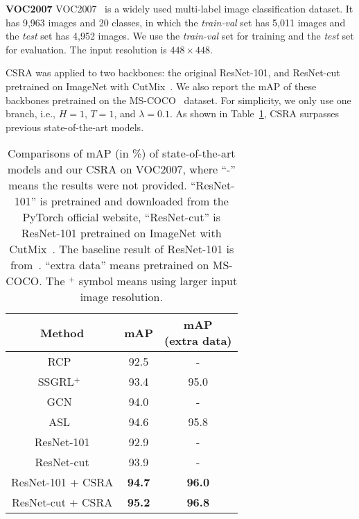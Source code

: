 \documentclass[10pt,twocolumn,letterpaper]{article}
\begin{document}
\noindent\textbf{VOC2007} VOC2007~\cite{VOC} is a widely used multi-label image classification dataset. It has 9,963 images and 20 classes, in which the \emph{train-val} set has 5,011 images and the \emph{test} set has 4,952 images. We use the \emph{train-val} set for training and the \emph{test} set for evaluation. The input resolution is $448 \times 448$.

CSRA was applied to two backbones: the original ResNet-101, and ResNet-cut pretrained on ImageNet with CutMix~\cite{cutmix}. We also report the mAP of these backbones pretrained on the MS-COCO~\cite{MSCOCO} dataset. For simplicity, we only use one branch, i.e., $H=1$, $T=1$, and $\lambda=0.1$. As shown in Table~\ref{tab:voc2007}, CSRA surpasses previous state-of-the-art models.

\begin{table}
	\caption{Comparisons of mAP (in \%) of state-of-the-art models and our CSRA on VOC2007, where ``-'' means the results were not provided. ``ResNet-101'' is pretrained and downloaded from the PyTorch official website, ``ResNet-cut'' is ResNet-101 pretrained on ImageNet with CutMix~\cite{cutmix}. The baseline result of ResNet-101 is from~\cite{2020_arxiv_Gaobb}. ``extra data'' means pretrained on MS-COCO. The $^+$ symbol means using larger input image resolution.}
	\label{tab:voc2007}
	\centering
	\small
	\begin{tabular}{c|cc}
		\hline
		Method                       & mAP           & \thead{mAP\\(extra data)} \\
		\hline\hline
		RCP~\cite{2016_ICIP_RCP}     & 92.5          & -                              \\
		SSGRL$^+$~\cite{2019_ICCV_GCNre} & 93.4          & 95.0                           \\
		GCN~\cite{2019_CVPR_GCN}     & 94.0          & -                              \\
		ASL~\cite{ASL_2020_arxiv}    & 94.6          & 95.8                           \\
		\hline
		ResNet-101                   & 92.9          & -                              \\
		ResNet-cut                   & 93.9          & -                              \\
		ResNet-101 + CSRA              & \textbf{94.7} & \textbf{96.0}                  \\
		ResNet-cut + CSRA              & \textbf{95.2} & \textbf{96.8}                  \\
		\hline
	\end{tabular}
\end{table}
\end{document}
